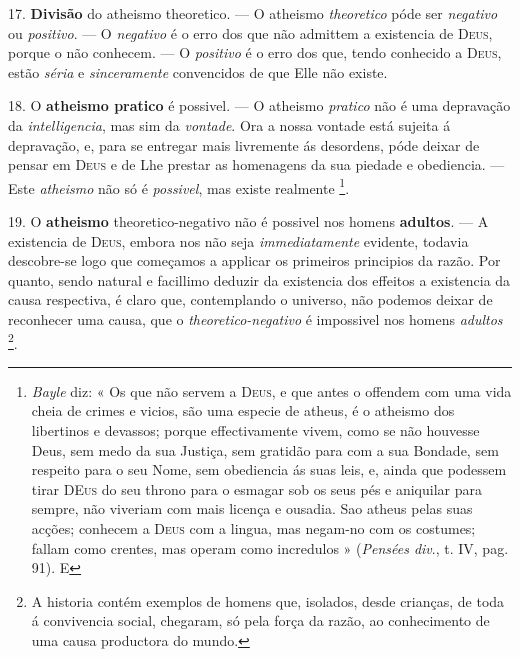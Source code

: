 17. \textbf{Divisão} do atheismo theoretico. --- O atheismo \emph{theoretico} póde ser \emph{negativo} ou \emph{positivo}. --- O \emph{negativo} é o erro dos que não admittem a existencia de \textsc{Deus}, porque o não conhecem. --- O \emph{positivo} é o erro dos que, tendo conhecido a \textsc{Deus}, estão \emph{séria} e \emph{sinceramente} convencidos de que Elle não existe.

 18. O \textbf{atheismo pratico} é possivel. --- O atheismo \emph{pratico} não é uma depravação da \emph{intelligencia}, mas sim da \emph{vontade}. Ora a nossa vontade está sujeita á depravação, e, para se entregar mais livremente ás desordens, póde deixar de pensar em \textsc{Deus} e de Lhe prestar as homenagens da sua piedade e obediencia. --- Este \emph{atheismo} não só é \emph{possivel}, mas existe realmente \footnote{\emph{Bayle} diz: « Os que não servem a \textsc{Deus}, e que antes o offendem com uma vida cheia de crimes e vicios, são uma especie de atheus, é o atheismo dos libertinos e devassos; porque effectivamente vivem, como se não houvesse Deus, sem medo da sua Justiça, sem gratidão para com a sua Bondade, sem respeito para o seu Nome, sem obediencia ás suas leis, e, ainda que podessem tirar \textsc{DEus} do seu throno para o esmagar sob os seus pés e aniquilar para sempre, não viveriam com mais licença e ousadia. Sao atheus pelas suas acções; conhecem a \textsc{Deus} com a lingua, mas negam-no com os costumes; fallam como crentes, mas operam como incredulos » (\emph{Pensées div}., t. IV, pag. 91). E}.

19. O \textbf{atheismo} theoretico-negativo não é possivel nos homens \textbf{adultos}. --- A existencia de \textsc{Deus}, embora nos não seja \emph{immediatamente} evidente, todavia descobre-se logo que começamos a applicar os primeiros principios da razão. Por quanto, sendo natural e facillimo deduzir da existencia dos effeitos a existencia da causa respectiva, é claro que, contemplando o universo, não podemos deixar de reconhecer uma causa, que o  \emph{theoretico-negativo} é impossivel nos homens \emph{adultos} \footnote{A historia contém exemplos de homens que, isolados, desde crianças, de toda á convivencia social, chegaram, só pela força da razão, ao conhecimento de uma causa productora do mundo.}.

